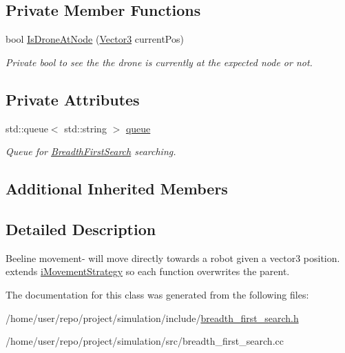 \subsection*{Private Member Functions}
\begin{DoxyCompactItemize}
\item 
\mbox{\label{classBreadthFirstSearch_a2f7227457d7b1e77a1345f38bfb16d36}} 
bool \hyperlink{classBreadthFirstSearch_a2f7227457d7b1e77a1345f38bfb16d36}{Is\+Drone\+At\+Node} (\hyperlink{classVector3}{Vector3} current\+Pos)
\begin{DoxyCompactList}\small\item\em Private bool to see the the drone is currently at the expected node or not. \end{DoxyCompactList}\end{DoxyCompactItemize}
\subsection*{Private Attributes}
\begin{DoxyCompactItemize}
\item 
\mbox{\label{classBreadthFirstSearch_a577ce5c2d8206b1b79f4de751960f3f4}} 
std\+::queue$<$ std\+::string $>$ \hyperlink{classBreadthFirstSearch_a577ce5c2d8206b1b79f4de751960f3f4}{queue}
\begin{DoxyCompactList}\small\item\em Queue for \hyperlink{classBreadthFirstSearch}{Breadth\+First\+Search} searching. \end{DoxyCompactList}\end{DoxyCompactItemize}
\subsection*{Additional Inherited Members}


\subsection{Detailed Description}
Beeline movement-\/ will move directly towards a robot given a vector3 position. extends \hyperlink{classiMovementStrategy}{i\+Movement\+Strategy} so each function overwrites the parent. 

The documentation for this class was generated from the following files\+:\begin{DoxyCompactItemize}
\item 
/home/user/repo/project/simulation/include/\hyperlink{breadth__first__search_8h}{breadth\+\_\+first\+\_\+search.\+h}\item 
/home/user/repo/project/simulation/src/breadth\+\_\+first\+\_\+search.\+cc\end{DoxyCompactItemize}
